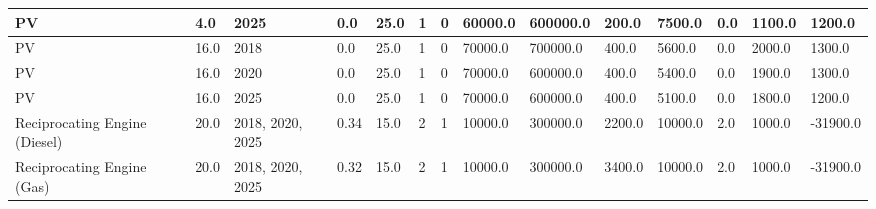 \documentclass[sigconf]{acmart}
\begin{document}
\begin{table*}[]
\begin{tabularx}{\linewidth}{|p{}|l|l|l|l|l|l|l|l|l|l|l|l|l|}
PV                            & 4.0         & 2025             & 0.0    & 25.0 & 1     & 0     & 60000.0  & 600000.0  & 200.0    & 7500.0  & 0.0   & 1100.0  & 1200.0   \\ \hline
PV                            & 16.0        & 2018             & 0.0    & 25.0 & 1     & 0     & 70000.0  & 700000.0  & 400.0    & 5600.0  & 0.0   & 2000.0  & 1300.0   \\ \hline
PV                            & 16.0        & 2020             & 0.0    & 25.0 & 1     & 0     & 70000.0  & 600000.0  & 400.0    & 5400.0  & 0.0   & 1900.0  & 1300.0   \\ \hline
PV                            & 16.0        & 2025             & 0.0    & 25.0 & 1     & 0     & 70000.0  & 600000.0  & 400.0    & 5100.0  & 0.0   & 1800.0  & 1200.0   \\ \hline
Reciprocating Engine (Diesel) & 20.0        & 2018, 2020, 2025 & 0.34   & 15.0 & 2     & 1     & 10000.0  & 300000.0  & 2200.0   & 10000.0 & 2.0   & 1000.0  & -31900.0 \\ \hline
Reciprocating Engine (Gas)    & 20.0        & 2018, 2020, 2025 & 0.32   & 15.0 & 2     & 1     & 10000.0  & 300000.0  & 3400.0   & 10000.0 & 2.0   & 1000.0  & -31900.0 \\ \hline
	\end{tabularx}
\end{table*}
\end{document}
